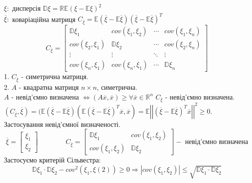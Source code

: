 \documentclass[fontsize=14pt,a4paper]{scrartcl}
\theoremstyle{definition}
\theoremstyle{remark}
\theoremstyle{definition}
\theoremstyle{definition}
\begin{document}
$\xi: $ дисперсія $\mathbb{D} \xi = \mathbb{R}\mathbb{E} (\xi - \mathbb{E}\xi)^2$\\
$ \overline{\xi}: $ коваріаційна матриця $C_{ \overline{\xi}} = \mathbb{E}( \overline{\xi} - \mathbb{E}\overline{\xi})(\overline{\xi} - \mathbb{E} \overline{\xi})^T$
$$
C_{ \overline{\xi}} = \begin{bmatrix}
 \mathbb{D} \xi_1 & cov(\xi_1, \xi_2) & \cdots & cov(\xi_1, \xi_n) \\
 cov(\xi_2, \xi_1) & \mathbb{D}\xi_2 & \cdots & cov(\xi_2, \xi_n)\\
 \vdots & \vdots & \ddots & \vdots\\
 cov(\xi_n, \xi_1)& cov(\xi_n, \xi_1) & \cdots & \mathbb{D}\xi_n
\end{bmatrix}
$$
1. $C_{\overline{\xi}}$ - симетрична матриця.\\
2. $A$ - квадратна матриця $n \times n$, симетрична.\\$A$ - невід'ємно визначена $\Leftrightarrow (A \overline{x}, \overline{x}) \geq \forall  \overline{x} \in \mathbb{R}^n$
$C_{\overline{\xi}}$ - невід'ємно визначена. $ (C_{\overline{\xi}}, \overline{\xi}) = (\mathbb{E}(\overline{\xi} - \mathbb{E}\overline{\xi})(\mathbb{E}(\overline{\xi} - \mathbb{E}\overline{\xi})^T \overline{x}, \overline{x} ) = \mathbb{E} \left| \left| (\overline{\xi} - \mathbb{E} \overline{\xi})^T \overline{x}\right| \right|^2 \geq 0 $.\\
Застосування невід'ємної визначеності.
$$
\overline{\xi} = \begin{bmatrix}
 \xi_1\\
 \xi_2
\end{bmatrix} \qquad \qquad C_{ \overline{\xi}} = \begin{bmatrix}
 \mathbb{D}\xi_1 & cov(\xi_1, \xi_2) \\
 cov(\xi_1, \xi_2) & \mathbb{D} \xi_2
\end{bmatrix} - \text{ невід'ємно визначена}
$$
Застосуємо критерій Сільвестра:
$$
\mathbb{D}\xi_1 \cdot \mathbb{D}\xi_2 - cov^2(\xi_1, \xi(2)) \geq 0 \Longrightarrow  \left| cov(\xi_1, \xi_2) \right| \leq \sqrt{ \mathbb{D} \xi_1 \cdot \mathbb{D}\xi_2}
$$
\end{document}
